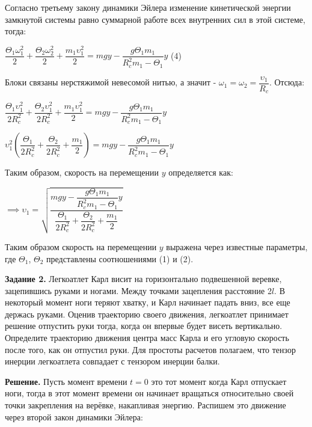 \documentclass[a4paper, 12pt]{article}
\begin{document}
	
	\quad Согласно третьему закону динамики Эйлера изменение кинетической энергии замкнутой системы равно суммарной работе всех внутренних сил в этой системе, тогда:
	
	\begin{center}
		$\dfrac{\Theta_1 \omega_1 ^2}{2}  + \dfrac{\Theta_2 \omega_2 ^2}{2} + \dfrac{m_1 \upsilon_1 ^2}{2} = mgy - \dfrac{g\Theta_1 m_1}{R_c^2 m_1 - \Theta_1} y$ (4)
	\end{center}
	
	\quad Блоки связаны нерстяжимой невесомой нитью, а значит - \newline $\omega_1 = \omega_2 = \dfrac{\upsilon_1}{R_c}$. Отсюда:
	
	\begin{center}
			$\dfrac{\Theta_1 \upsilon_1 ^2}{2R_c^2}  + \dfrac{\Theta_2 \upsilon_1 ^2}{2R_c^2} + \dfrac{m_1 \upsilon_1 ^2}{2} = mgy - \dfrac{g\Theta_1 m_1}{R_c^2 m_1 - \Theta_1} y$
			
			$\upsilon_1^2 \left( \dfrac{\Theta_1}{2R_c^2} + \dfrac{\Theta_2}{2 R_c^2} + \dfrac{m_1}{2}\right) = mgy - \dfrac{g\Theta_1 m_1}{R_c^2 m_1 - \Theta_1} y$
			
			Таким образом, скорость на перемещении $y$ определяется как:
			
			$\implies \upsilon_1 =\sqrt{ \dfrac{mgy - \dfrac{g\Theta_1 m_1}{R_c^2 m_1 - \Theta_1} y}{\dfrac{\Theta_1}{2R_c^2} + \dfrac{\Theta_2}{2 R_c^2} + \dfrac{m_1}{2}}}$
			
	\end{center}
	
	\quad Таким образом скорость на перемещении $y$ выражена через известные параметры, где $\Theta_1$, $\Theta_2$ представлены соотношениями (1) и (2).
	
	
	\quad \textbf{Задание 2.} Легкоатлет Карл висит на горизонтально подвешенной веревке, зацепившись руками и ногами. Между точками зацепления расстояние 2$l$. В некоторый момент ноги теряют хватку, и Карл начинает падать вниз, все еще держась руками. Оценив траекторию своего движения, легкоатлет принимает решение отпустить руки тогда, когда он впервые будет висеть вертикально. Определите траекторию движения центра масс Карла и его угловую скорость после того, как он отпустил руки. Для простоты расчетов полагаем, что тензор инерции легкоатлета совпадает с тензором инерции балки.
	
	\quad \textbf{Решение.} Пусть момент времени $t =0$ это тот момент когда Карл отпускает ноги, тогда в этот момент времени он начинает вращаться относительно своей точки закрепления на верёвке, накапливая энергию. Распишем это движение через второй закон динамики Эйлера:
	
\end{document}
